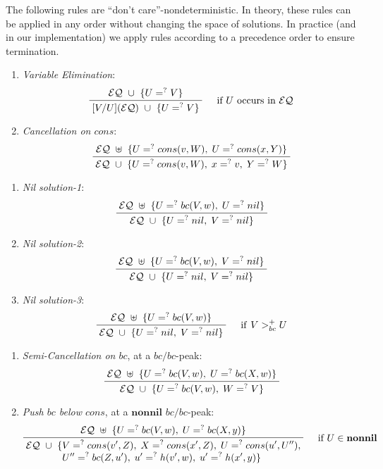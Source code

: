 \documentclass[11pt]{article}
\newcommand{\ueq}{=_{}^?}
\newcommand{\EQ}{\mathcal{EQ}}
\newcommand{\Bc}{\mathit{bc}}
\newcommand{\Cons}{\mathit{cons}}
\newcommand{\Nonnil}{\mathbf{nonnil}}
\begin{document}
The following rules are ``don't care''-nondeterministic. In theory, these rules
can be applied in any order without changing the space of solutions. In practice
(and in our implementation) we apply rules according to a precedence order to
ensure termination.
\begin{enumerate}[(L1), align=left, font=\bfseries]
    \item \emph{Variable Elimination}:
        \[\infer[\quad \text{if } U \text{ occurs in } \EQ ]
            {\; [V/U](\EQ) ~ \cup ~ \{U \ueq V\} \;}
            {\; \EQ ~ \cup ~ \{U \ueq V\} \;}
        \]

    \item \emph{Cancellation on $\Cons$}:
        \[\infer
            {\; \EQ ~ \cup ~ \{ U \ueq cons(v, W), \; x \ueq v, \; Y \ueq W \} \;}
            {\; \EQ ~ \uplus ~ \{ U \ueq cons(v, W), \; U \ueq cons(x, Y) \} \;}
        \]
\end{enumerate}
\begin{enumerate}[(L3.a), align=left, font=\bfseries]
    \item \emph{Nil solution-1}:
        \[\infer
            {\; \EQ ~ \cup ~ \{ U \ueq nil, \; V \ueq nil \} \;}
            {\; \EQ ~ \uplus ~ \{ U \ueq bc(V, w), \; U \ueq nil \} \;}
        \]

    \item \emph{Nil solution-2}:
        \[\infer
            {\; \EQ ~ \cup ~ \{ U \ueq nil, \; V \ueq nil \} \;}
            {\; \EQ ~ \uplus ~ \{ U \ueq bc(V, w), \; V \ueq nil \} \;}
        \]

    \item \emph{Nil solution-3}:
        \[\infer[\quad \mathrm{if} ~ V >_{bc}^{+} U ]
            {\; \EQ ~ \cup ~ \{ U \ueq nil, \; V \ueq nil \} \;}
            {\; \EQ ~ \uplus ~ \{ U \ueq bc(V, w) \} \;}
        \]
\end{enumerate}
\begin{enumerate}[(L4.a), align=left, font=\bfseries]
    \item \emph{Semi-Cancellation on $\Bc$}, at a $\Bc/\Bc$-peak:
        \[\infer
            {\; \EQ ~ \cup ~ \{U \ueq bc(V, w), \; W \ueq V \} \;}
            {\; \EQ ~ \uplus ~ \{ U \ueq bc(V, w), \; U \ueq bc(X, w) \} \;}
        \]

    \item \emph{Push $\Bc$ below $\Cons$}, at a $\Nonnil$ $\Bc/\Bc$-peak:
        \[\infer[\quad \text{if } U \in \Nonnil]
            {\; \begin{aligned}
                \EQ ~ \cup ~ \{
                & V \ueq cons(v', Z), \; X \ueq cons(x', Z), \;
                  U \ueq cons(u', U''), \\[-4pt]
                & U'' \ueq bc(Z, u'), \; u' \ueq h(v', w), \;
                  u' \ueq h(x', y) \}
            \end{aligned} \;}
            {\; \EQ ~ \uplus ~ \{ U \ueq bc(V, w), \; U \ueq bc(X, y) \} \;}
        \]
\end{enumerate}
\end{document}
